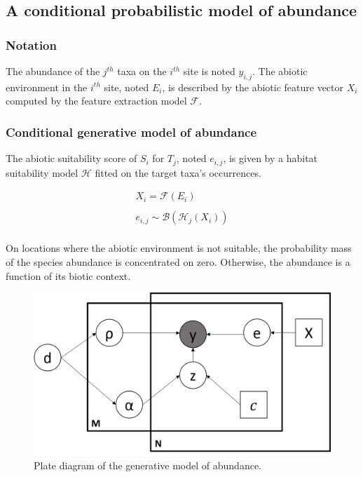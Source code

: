 \documentclass[]{article}
\begin{document}
\subsection{A conditional probabilistic model of abundance}
\subsubsection{Notation} %
The abundance of the $j^{th}$ taxa on the $i^{th}$ site is noted $y_{i,j}$. The abiotic environment in the $i^{th}$ site, noted $E_i$, is described by the abiotic feature vector $X_i$ computed by the feature extraction model $\mathcal{F}$. 

\subsubsection{Conditional generative model of abundance}
The abiotic suitability score of $S_i$ for $T_j$, noted $e_{i,j}$, is given by a habitat suitability model $\mathcal{H}$ fitted on the target taxa's occurrences. 

\begin{equation*}
\begin{matrix}
	X_i=\mathcal{F}(E_i) \\\\
    e_{i,j} \sim \mathcal{B}(\mathcal{H}_j(X_i)) \\  
\end{matrix}
\end{equation*}

\noindent On locations where the abiotic environment is not suitable, the probability mass of the species abundance is concentrated on zero. Otherwise, the abundance is a function of its biotic context. \\

\begin{figure}[h]
	\centering
	\includegraphics[scale=0.5]{plate}
	\caption{Plate diagram of the generative model of abundance.}
	\label{plate}
\end{figure}
\end{document}
